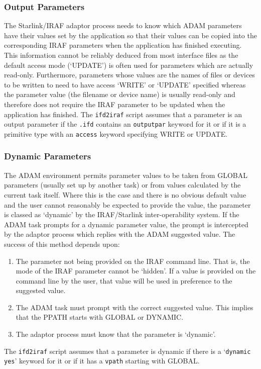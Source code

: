 \documentclass[twoside,11pt]{article}
\newcommand{\xref}[3]{#1}
\newcommand{\xlabel}[1]{}
\begin{document}
\subsubsection{\xlabel{output_parameters}Output Parameters}
The Starlink/IRAF adaptor process needs to know which ADAM parameters have
their values set by the application so that their values can be copied
into the corresponding IRAF parameters when the application has finished
executing. This information cannot be reliably deduced from most interface
files as the default access mode (`UPDATE') is often used for parameters which
are actually read-only.
Furthermore, parameters whose values are the names of files or devices to be
written to need to have access `WRITE' or `UPDATE' specified whereas the
parameter value (the filename or device name) is usually read-only and
therefore does not require the IRAF parameter to be updated when the
application has finished.
The
\xref{\texttt{ifd2iraf}}{ssn68}{producing_iraf_files_from_an_ifd}
script assumes that a parameter is an output parameter
if the \texttt{.ifd} contains an
\xref{\texttt{outputpar}}{ssn68}{outputpar}
keyword for it or if it is a primitive type with an
\xref{\texttt{access}}{ssn68}{access}
keyword specifying WRITE or UPDATE.

\subsubsection{\xlabel{dynamic_parameters}\label{dynamic_parameters}Dynamic
Parameters}
The ADAM environment permits parameter values to be taken from GLOBAL
parameters (usually set up by another task) or from values calculated by the
current task itself. Where this is the case and there is no obvious default
value and the user cannot reasonably be expected to provide the value, the
parameter is classed as `dynamic' by the IRAF/Starlink inter-operability
system. If the ADAM task prompts for a dynamic parameter value, the prompt
is intercepted by the adaptor process which replies with the ADAM suggested
value. The success of this method depends upon:
\begin{enumerate}
\item The parameter not being provided on the IRAF command line. That is,
the mode of the IRAF parameter cannot be `hidden'. If a value is provided on
the command line by the user, that value will be used in preference to the
suggested value.
\item The ADAM task must prompt with the correct suggested value. This implies
that the PPATH starts with GLOBAL or DYNAMIC.
\item The adaptor process must know that the parameter is `dynamic'.
\end{enumerate}
The
\xref{\texttt{ifd2iraf}}{ssn68}{producing_iraf_files_from_an_ifd}
script assumes that a parameter is dynamic if there is a
\xref{`\texttt{dynamic yes}'}{ssn68}{dynamic}
keyword for it or if it has a
\xref{\texttt{vpath}}{ssn68}{vpath}
starting with GLOBAL.
\end{document}
